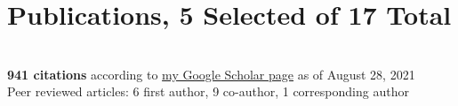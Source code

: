 \documentclass[letterpaper]{twentysecondcv3} %
\begin{document}
\section{Publications, 5 Selected of 17 Total}\\
\textbf{941 citations} according to \href{https://scholar.google.com/citations?user=bgdnUn8AAAAJ&hl=en}{my Google Scholar page} as of August 28, 2021\\
Peer reviewed articles: 6 first author, 9 co-author, 1 corresponding author

\nocite{Michalak2020, Gaby2017, Gaby2014, Gaby2012, Gaby2011}

%
%
%
%

%
%
\end{document}
